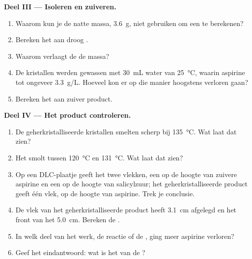 \begin{problem}
\medskip
\noindent\textbf{Deel III --- Isoleren en zuiveren.}
\begin{enumerate}[resume]
  \item Waarom kun je de natte massa, \qty{3.6}{g}, niet gebruiken om een
         te berekenen?
  \item Bereken het  aan droog .
  \item Waarom verlaagt de  de massa?
  \item De kristallen werden gewassen met \qty{30}{mL} water van
        \qty{25}{\celsius}, waarin aspirine  tot ongeveer
        \qty{3.3}{g/L}. Hoeveel kon er op die manier hoogstens verloren
        gaan?
  \item Bereken het  aan zuiver product.
\end{enumerate}

\medskip
\noindent\textbf{Deel IV --- Het product controleren.}
\begin{enumerate}[resume]
  \item De geherkristalliseerde kristallen smelten scherp bij
        \qty{135}{\celsius}. Wat laat dat zien?
  \item Het  smolt tussen \qty{120}{\celsius} en
        \qty{131}{\celsius}. Wat laat dat zien?
  \item Op een DLC-plaatje geeft het  twee vlekken, een op
        de hoogte van zuivere aspirine en een op de hoogte van
        salicylzuur; het geherkristalliseerde product geeft één vlek, op
        de hoogte van aspirine. Trek je conclusie.
  \item De vlek van het geherkristalliseerde product heeft \qty{3.1}{cm}
        afgelegd en het front van het  \qty{5.0}{cm}. Bereken de
        .
  \item In welk deel van het werk, de reactie of de , ging
        meer aspirine verloren?
  \item Geef het eindantwoord: wat is het  van de ?
\end{enumerate}
\end{problem}
